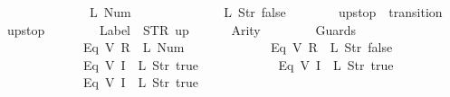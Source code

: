 \begin{isabellebody}
\ \ \ \ \ \ \ \ \ \ \ \ {\isacharparenleft}{}{\isacharcomma}\ {\isacharparenleft}L\ {\isacharparenleft}Num\ {}{\isacharparenright}{\isacharparenright}{\isacharparenright}{\isacharcomma}\isanewline
\ \ \ \ \ \ \ \ \ \ \ \ {\isacharparenleft}{}{\isacharcomma}\ {\isacharparenleft}L\ {\isacharparenleft}Str\ {\isacharprime}{\isacharprime}false{\isacharprime}{\isacharprime}{\isacharparenright}{\isacharparenright}{\isacharparenright}\isanewline
\ \ \ \ \ \ {\isacharbrackright}\isanewline
{\isasymrparr}{\isachardoublequoteclose}\isanewline
\isanewline
{}\isamarkupfalse%
\ {\isachardoublequoteopen}up{}{}stop{\isachardoublequoteclose}\ {\isacharcolon}{\isacharcolon}\ {\isachardoublequoteopen}transition{\isachardoublequoteclose}\ \isanewline
{\isachardoublequoteopen}up{}{}stop\ {\isasymequiv}\ {\isasymlparr}\isanewline
\ \ \ \ \ \ Label\ {\isacharequal}\ STR\ {\isacharprime}{\isacharprime}up{\isacharprime}{\isacharprime}{\isacharcomma}\isanewline
\ \ \ \ \ \ Arity\ {\isacharequal}\ {}{\isacharcomma}\isanewline
\ \ \ \ \ \ Guards\ {\isacharequal}\ {\isacharbrackleft}\isanewline
\ \ \ \ \ \ \ \ \ \ \ \ {\isacharparenleft}Eq\ {\isacharparenleft}V\ {\isacharparenleft}R\ {}{\isacharparenright}{\isacharparenright}\ {\isacharparenleft}L\ {\isacharparenleft}Num\ {}{\isacharparenright}{\isacharparenright}{\isacharparenright}{\isacharcomma}\isanewline
\ \ \ \ \ \ \ \ \ \ \ \ {\isacharparenleft}Eq\ {\isacharparenleft}V\ {\isacharparenleft}R\ {}{\isacharparenright}{\isacharparenright}\ {\isacharparenleft}L\ {\isacharparenleft}Str\ {\isacharprime}{\isacharprime}false{\isacharprime}{\isacharprime}{\isacharparenright}{\isacharparenright}{\isacharparenright}{\isacharcomma}\isanewline
\ \ \ \ \ \ \ \ \ \ \ \ {\isacharparenleft}Eq\ {\isacharparenleft}V\ {\isacharparenleft}I\ {}{\isacharparenright}{\isacharparenright}\ {\isacharparenleft}L\ {\isacharparenleft}Str\ {\isacharprime}{\isacharprime}true{\isacharprime}{\isacharprime}{\isacharparenright}{\isacharparenright}{\isacharparenright}{\isacharcomma}\isanewline
\ \ \ \ \ \ \ \ \ \ \ \ {\isacharparenleft}Eq\ {\isacharparenleft}V\ {\isacharparenleft}I\ {}{\isacharparenright}{\isacharparenright}\ {\isacharparenleft}L\ {\isacharparenleft}Str\ {\isacharprime}{\isacharprime}true{\isacharprime}{\isacharprime}{\isacharparenright}{\isacharparenright}{\isacharparenright}{\isacharcomma}\isanewline
\ \ \ \ \ \ \ \ \ \ \ \ {\isacharparenleft}Eq\ {\isacharparenleft}V\ {\isacharparenleft}I\ {}{\isacharparenright}{\isacharparenright}\ {\isacharparenleft}L\ {\isacharparenleft}Str\ {\isacharprime}{\isacharprime}true{\isacharprime}{\isacharprime}{\isacharparenright}{\isacharparenright}{\isacharparenright}\isanewline

\end{isabellebody}
